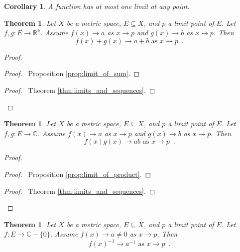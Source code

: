 \documentclass{book}
\let\qed\relax
\newtheorem{cor}{Corollary}[prop]
\newtheorem{thm}[prop]{Theorem}
\theoremstyle{definition}
\begin{document}
\begin{cor}
A function has at most one limit at any point.
\end{cor}

\begin{thm}
Let $X$ be a metric space, $E \subseteq X$, and $p$ a limit point of $E$. Let $f,g : E \rightarrow \mathbb{R}^k$. Assume $f(x) \rightarrow a$ as $x \rightarrow p$ and $g(x) \rightarrow b$ as $x \rightarrow p$. Then
\[ f(x) + g(x) \rightarrow a + b \text{ as } x \rightarrow p \enspace . \]
\end{thm}

\begin{proof}
\pf
{}
\begin{proof}
	\pf\ Proposition \ref{prop:limit_of_sum}.
\end{proof}
\qedstep
\begin{proof}
	\pf\ Theorem \ref{thm:limits_and_sequences}.
\end{proof}
\qed
\end{proof}

\begin{thm}
Let $X$ be a metric space, $E \subseteq X$, and $p$ a limit point of $E$. Let $f,g : E \rightarrow \mathbb{C}$. Assume $f(x) \rightarrow a$ as $x \rightarrow p$ and $g(x) \rightarrow b$ as $x \rightarrow p$. Then
\[ f(x) g(x) \rightarrow a b \text{ as } x \rightarrow p \enspace . \]
\end{thm}

\begin{proof}
\pf
{}
\begin{proof}
	\pf\ Proposition \ref{prop:limit_of_product}.
\end{proof}
\qedstep
\begin{proof}
	\pf\ Theorem \ref{thm:limits_and_sequences}.
\end{proof}
\qed
\end{proof}

\begin{thm}
Let $X$ be a metric space, $E \subseteq X$, and $p$ a limit point of $E$. Let $f : E \rightarrow \mathbb{C} - \{0\}$. Assume $f(x) \rightarrow a \neq 0$ as $x \rightarrow p$. Then
\[ f(x)^{-1} \rightarrow a^{-1} \text{ as } x \rightarrow p \enspace . \]
\end{thm}
\end{document}
